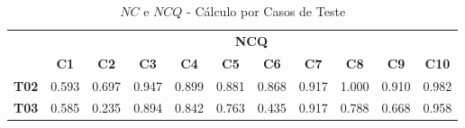 \begin{table}[htbp]
	\centering
	\caption{$NC$ e $NCQ$ - Cálculo por Casos de Teste}
	\begin{tabular}{|c|cccccccccc|}
		\hline
		\rowcolor[HTML]{D0CECE} 
		\cellcolor[HTML]{D0CECE}                                 & \multicolumn{10}{c|}{\cellcolor[HTML]{D0CECE}\textbf{NCQ}}                                                                                                                                                                                                                                                                                                                                                                                                                                                                                                                      \\ \cline{2-11} 
		\rowcolor[HTML]{D0CECE} 
		\multirow{-2}{*}{\cellcolor[HTML]{D0CECE}\textbf{Part.}} & \multicolumn{1}{c|}{\cellcolor[HTML]{D0CECE}\textbf{C1}} & \multicolumn{1}{c|}{\cellcolor[HTML]{D0CECE}\textbf{C2}} & \multicolumn{1}{c|}{\cellcolor[HTML]{D0CECE}\textbf{C3}} & \multicolumn{1}{c|}{\cellcolor[HTML]{D0CECE}\textbf{C4}} & \multicolumn{1}{c|}{\cellcolor[HTML]{D0CECE}\textbf{C5}} & \multicolumn{1}{c|}{\cellcolor[HTML]{D0CECE}\textbf{C6}} & \multicolumn{1}{c|}{\cellcolor[HTML]{D0CECE}\textbf{C7}} & \multicolumn{1}{c|}{\cellcolor[HTML]{D0CECE}\textbf{C8}} & \multicolumn{1}{c|}{\cellcolor[HTML]{D0CECE}\textbf{C9}} & \textbf{C10}                 \\ \hline
		\textbf{T02}                                             & \multicolumn{1}{c|}{0.593}                               & \multicolumn{1}{c|}{0.697}                               & \multicolumn{1}{c|}{0.947}                               & \multicolumn{1}{c|}{0.899}                               & \multicolumn{1}{c|}{0.881}                               & \multicolumn{1}{c|}{0.868}                               & \multicolumn{1}{c|}{0.917}                               & \multicolumn{1}{c|}{1.000}                               & \multicolumn{1}{c|}{0.910}                               & 0.982                        \\ \hline
		\rowcolor[HTML]{F2F2F2} 
		\textbf{T03}                                             & \multicolumn{1}{c|}{\cellcolor[HTML]{F2F2F2}0.585}       & \multicolumn{1}{c|}{\cellcolor[HTML]{F2F2F2}0.235}       & \multicolumn{1}{c|}{\cellcolor[HTML]{F2F2F2}0.894}       & \multicolumn{1}{c|}{\cellcolor[HTML]{F2F2F2}0.842}       & \multicolumn{1}{c|}{\cellcolor[HTML]{F2F2F2}0.763}       & \multicolumn{1}{c|}{\cellcolor[HTML]{F2F2F2}0.435}       & \multicolumn{1}{c|}{\cellcolor[HTML]{F2F2F2}0.917}       & \multicolumn{1}{c|}{\cellcolor[HTML]{F2F2F2}0.788}       & \multicolumn{1}{c|}{\cellcolor[HTML]{F2F2F2}0.668}       & 0.958                        \\ \hline

\end{tabular}
\end{table}
